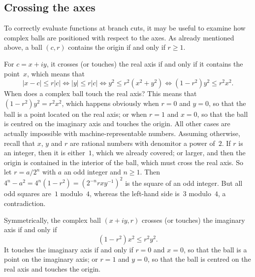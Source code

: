 \documentclass [11pt]{article}
\renewcommand {\leq}{\leqslant}
\renewcommand {\geq}{\geqslant}
\begin{document}
\subsection {Crossing the axes}

\begin {center}
\end {center}

To correctly evaluate functions at branch cuts, it may be useful to examine
how complex balls are positioned with respect to the axes.
As already mentioned above, a ball $(c, r)$ contains the origin if and only
if $r \geq 1$.

For $c = x + i y$, it crosses (or touches) the real axis if and only if
it contains the point~$x$, which means that
\[
|x - c| \leq r |c|
\Leftrightarrow |y| \leq r |c|
\Leftrightarrow y^2 \leq r^2 \left( x^2 + y^2 \right)
\Leftrightarrow \left(1 - r^2 \right) y^2 \leq r^2 x^2.
\]
When does a complex ball touch the real axis?
This means that $(1 - r^2) y^2 = r^2 x^2$, which happens obviously when
$r = 0$ and $y = 0$, so that the ball is a point located on the real axis;
or when $r = 1$ and $x = 0$, so that the ball is centred on the imaginary
axis and touches the origin. All other cases are actually impossible with
machine-representable numbers. Assuming otherwise, recall that $x$, $y$
and $r$ are rational numbers with denomitor a power of~$2$.
If $r$ is an integer, then it is either~$1$, which we already covered;
or larger, and then the origin is contained in the interior of the ball,
which must cross the real axis.
So let $r = a / 2^n$ with $a$ an odd integer and $n \geq 1$. Then
$4^n - a^2 = 4^n (1 - r^2) = (2^{-n} r x y^{-1})^2$ is the square of an
odd integer. But all odd squares are~$1$ modulo~$4$, whereas the left-hand
side is~$3$ modulo~$4$, a contradiction.

Symmetrically, the complex ball $(x + i y, r)$ crosses (or touches) the
imaginary axis if and only if
\[
\left(1 - r^2 \right) x^2 \leq r^2 y^2.
\]
It touches the imaginary axis if and only if $r = 0$ and $x = 0$, so that
the ball is a point on the imaginary axis; or $r = 1$ and $y = 0$, so that
the ball is centred on the real axis and touches the origin.
\end{document}
